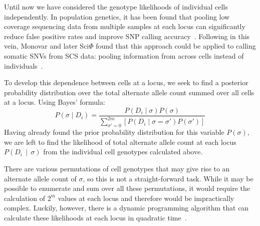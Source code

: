 \documentclass[../../main.tex]{subfiles}
\begin{document}
Until now we have considered the genotype likelihoods of individual cells independently.
In population genetics, it has been found that pooling low coverage sequencing data from multiple samples at each locus can significantly reduce false positive rates and improve SNP calling accuracy~\cite{ledurbin, listatistical}.
Following in this vein, Monovar and later Sci$\Phi$ found that this approach could be applied to calling somatic SNVs from SCS data: pooling information from across cells instead of individuals~\cite{monovar, sciphi}.

To develop this dependence between cells at a locus, we seek to find a posterior probability distribution over the total alternate allele count summed over all cells at a locus.
Using Bayes' formula:
\begin{equation}\label{eq:sitebayes}
P\left(\sigma \mid D_i\right) = \frac{P(D_i\mid \sigma)P(\sigma)}{\sum_{\sigma'=0}^{2m}[P(D_i\mid \sigma=\sigma')P(\sigma')]}
\end{equation}
Having already found the prior probability distribution for this variable $P(\sigma)$, we are left to find the likelihood of total alternate allele count at each locus $P(D_i\,\mid\,\sigma)$ from the individual cell genotypes calculated above.

There are various permutations of cell genotypes that may give rise to an alternate allele count of $\sigma$, so this is not a straight-forward task.
While it may be possible to enumerate and sum over all these permutations, it would require the calculation of $2^m$ values at each locus and therefore would be impractically complex.
Luckily, however, there is a dynamic programming algorithm that can calculate these likelihoods at each locus in quadratic time~\cite{ledurbin, listatistical, monovar}.
\end{document}
